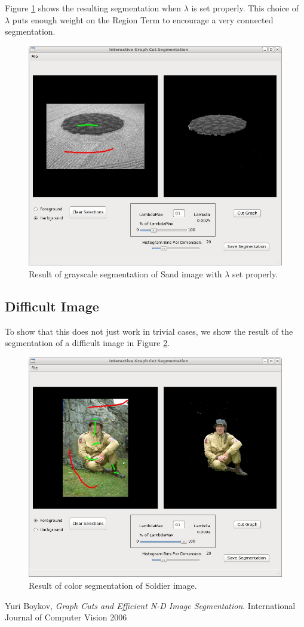 \documentclass{InsightArticle}
\begin{document}
Figure \ref{fig:Sand} shows the resulting segmentation when $\lambda$ is set properly. This choice of $\lambda$ puts enough weight on the Region Term to encourage a very connected segmentation.

\begin{center}
	\begin{figure}[H]
  \centering
		\includegraphics[width=0.6\linewidth]{images/Sand}
		\caption{Result of grayscale segmentation of Sand image with $\lambda$ set properly.}
		\label{fig:Sand}
	\end{figure}
\end{center} 

\subsection{Difficult Image}
To show that this does not just work in trivial cases, we show the result of the segmentation of a difficult image in Figure \ref{fig:Soldier}.

\begin{center}
	\begin{figure}[H]
  \centering
		\includegraphics[width=0.6\linewidth]{images/Soldier}
		\caption{Result of color segmentation of Soldier image.}
		\label{fig:Soldier}
	\end{figure}
\end{center} 

\begin{thebibliography}{9}

	  Yuri Boykov,
	  \emph{Graph Cuts and Efficient N-D Image Segmentation}.
	  International Journal of Computer Vision
	  2006

\end{thebibliography}
\end{document}
